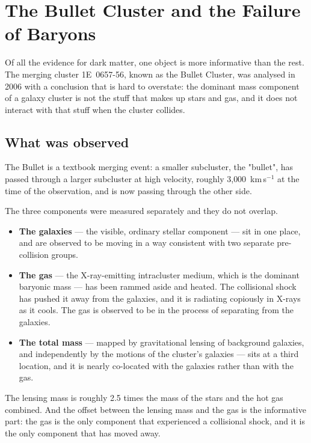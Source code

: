 
\chapter{The Bullet Cluster and the Failure of Baryons}
\label{ch:bullet}

Of all the evidence for dark matter, one object is more informative than the
rest. The merging cluster 1E~0657-56, known as the Bullet Cluster, was
analysed in 2006 with a conclusion that is hard to overstate: the dominant
mass component of a galaxy cluster is not the stuff that makes up stars and
gas, and it does not interact with that stuff when the cluster collides.

\section{What was observed}The Bullet is a textbook merging event: a smaller
subcluster, the "bullet", has passed through a larger subcluster at high
velocity, roughly 3{,}000~km\,s$^{-1}$ at the time of the observation, and
is now passing through the other side.

The three components were measured separately and they do not overlap.

\begin{itemize}
\item \textbf{The galaxies} --- the visible, ordinary stellar component ---
sit in one place, and are observed to be moving in a way consistent with two
separate pre-collision groups.
\item \textbf{The gas} --- the X-ray-emitting intracluster medium, which is
the dominant baryonic mass --- has been rammed aside and heated. The
collisional shock has pushed it away from the galaxies, and it is radiating
copiously in X-rays as it cools. The gas is observed to be in the process of
separating from the galaxies.
\item \textbf{The total mass} --- mapped by gravitational lensing of
background galaxies, and independently by the motions of the cluster's
galaxies --- sits at a third location, and it is nearly co-located with the
galaxies rather than with the gas.
\end{itemize}

The lensing mass is roughly 2.5 times the mass of the stars and the hot gas
combined. And the offset between the lensing mass and the gas is the
informative part: the gas is the only component that experienced a
collisional shock, and it is the only component that has moved away.

